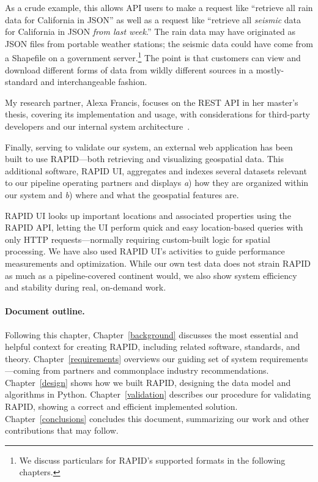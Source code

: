 As a crude example, this allows API users to make a request like ``retrieve all rain data for California in JSON'' as well as a request like ``retrieve all \textit{seismic} data for California in JSON \textit{from last week}.'' The rain data may have originated as JSON files from portable weather stations; the seismic data could have come from a Shapefile on a government server.\footnote{We discuss particulars for RAPID's supported formats in the following chapters.} The point is that customers can view and download different forms of data from wildly different sources in a mostly-standard and interchangeable fashion.

My research partner, Alexa Francis, focuses on the REST API in her master's thesis, covering its implementation and usage, with considerations for third-party developers and our internal system architecture~\cite{Francis}.

\label{polyview_intro}
Finally, serving to validate our system, an external web application has been built to use RAPID---both retrieving and visualizing geospatial data. This additional software, RAPID UI, aggregates and indexes several datasets relevant to our pipeline operating partners and displays \textit{a}) how they are organized within our system and \textit{b}) where and what the geospatial features are.

RAPID UI looks up important locations and associated properties using the RAPID API, letting the UI perform quick and easy location-based queries with only HTTP requests---normally requiring custom-built logic for spatial processing. We have also used RAPID UI's activities to guide performance measurements and optimization. While our own test data does not strain RAPID as much as a pipeline-covered continent would, we also show system efficiency and stability during real, on-demand work.

\paragraph{Document outline.}
Following this chapter, Chapter~\ref{background} discusses the most essential and helpful context for creating RAPID, including related software, standards, and theory. Chapter~\ref{requirements} overviews our guiding set of system requirements---coming from partners and commonplace industry recommendations. Chapter~\ref{design} shows how we built RAPID, designing the data model and algorithms in Python. Chapter~\ref{validation} describes our procedure for validating RAPID, showing a correct and efficient implemented solution. Chapter~\ref{conclusions} concludes this document, summarizing our work and other contributions that may follow.


